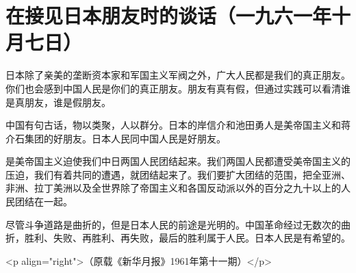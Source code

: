 \section{在接见日本朋友时的谈话（一九六一年十月七日）}


日本除了亲美的垄断资本家和军国主义军阀之外，广大人民都是我们的真正朋友。你们也会感到中国人民是你们的真正朋友。朋友有真有假，但通过实践可以看清谁是真朋友，谁是假朋友。

中国有句古话，物以类聚，人以群分。日本的岸信介和池田勇人是美帝国主义和蒋介石集团的好朋友。日本人民同中国人民是好朋友。

是美帝国主义迫使我们中日两国人民团结起来。我们两国人民都遭受美帝国主义的压迫，我们有着共同的遭遇，就团结起来了。我们要扩大团结的范围，把全亚洲、非洲、拉丁美洲以及全世界除了帝国主义和各国反动派以外的百分之九十以上的人民团结在一起。

尽管斗争道路是曲折的，但是日本人民的前途是光明的。中国革命经过无数次的曲折，胜利、失败、再胜利、再失败，最后的胜利属于人民。日本人民是有希望的。

<p align="right">（原载《新华月报》1961年第十一期）</p>


